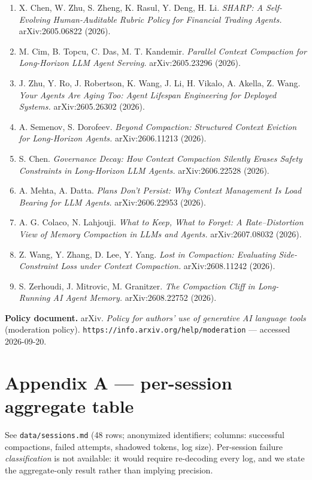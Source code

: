 \documentclass[
]{article}
\providecommand{\tightlist}{%
  \setlength{\itemsep}{0pt}\setlength{\parskip}{0pt}}
\begin{document}
\begin{enumerate}
\def\labelenumi{\arabic{enumi}.}
\tightlist
\item
  X. Chen, W. Zhu, S. Zheng, K. Rasul, Y. Deng, H. Li. \emph{SHARP: A
  Self-Evolving Human-Auditable Rubric Policy for Financial Trading
  Agents.} arXiv:2605.06822 (2026).
\item
  M. Cim, B. Topcu, C. Das, M. T. Kandemir. \emph{Parallel Context
  Compaction for Long-Horizon LLM Agent Serving.} arXiv:2605.23296
  (2026).
\item
  J. Zhu, Y. Ro, J. Robertson, K. Wang, J. Li, H. Vikalo, A. Akella, Z.
  Wang. \emph{Your Agents Are Aging Too: Agent Lifespan Engineering for
  Deployed Systems.} arXiv:2605.26302 (2026).
\item
  A. Semenov, S. Dorofeev. \emph{Beyond Compaction: Structured Context
  Eviction for Long-Horizon Agents.} arXiv:2606.11213 (2026).
\item
  S. Chen. \emph{Governance Decay: How Context Compaction Silently
  Erases Safety Constraints in Long-Horizon LLM Agents.}
  arXiv:2606.22528 (2026).
\item
  A. Mehta, A. Datta. \emph{Plans Don't Persist: Why Context Management
  Is Load Bearing for LLM Agents.} arXiv:2606.22953 (2026).
\item
  A. G. Colaco, N. Lahjouji. \emph{What to Keep, What to Forget: A
  Rate--Distortion View of Memory Compaction in LLMs and Agents.}
  arXiv:2607.08032 (2026).
\item
  Z. Wang, Y. Zhang, D. Lee, Y. Yang. \emph{Lost in Compaction:
  Evaluating Side-Constraint Loss under Context Compaction.}
  arXiv:2608.11242 (2026).
\item
  S. Zerhoudi, J. Mitrovic, M. Granitzer. \emph{The Compaction Cliff in
  Long-Running AI Agent Memory.} arXiv:2608.22752 (2026).
\end{enumerate}

\textbf{Policy document.} arXiv. \emph{Policy for authors' use of
generative AI language tools} (moderation policy).
\texttt{https://info.arxiv.org/help/moderation} --- accessed 2026-09-20.

\section{Appendix A --- per-session aggregate
table}\label{appendix-a-per-session-aggregate-table}

See \texttt{data/sessions.md} (48 rows; anonymized identifiers; columns:
successful compactions, failed attempts, shadowed tokens, log size).
Per-session failure \emph{classification} is not available: it would
require re-decoding every log, and we state the aggregate-only result
rather than implying precision.
\end{document}
